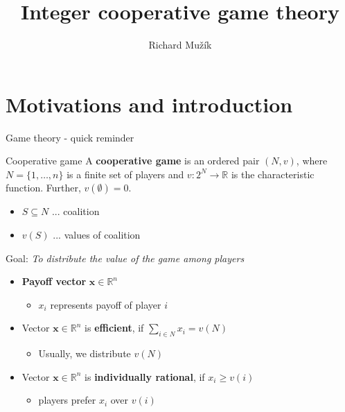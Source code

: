 \documentclass{beamer}
\title{Integer cooperative game theory}
\author{Richard Mužík}
\institute{richard@imuzik.cz}
\newcommand{\Rn}[1][n]{\mathbb{R}^{#1}}
\newcommand{\bx}{\textbf{x}}
\begin{document}

\begin{frame}
	\maketitle %
\end{frame}


\section{Motivations and introduction} %


\begin{frame}{Game theory - quick reminder}
    \begin{block}{Cooperative game}
        A \textbf{cooperative game} is an ordered pair $(N,v)$, where $N=\{1,\dots,n\}$ is a finite set of players and $v\colon 2^N \to \mathbb{R}$ is the characteristic function. Further, $v(\emptyset) = 0$.
    \end{block}
    \begin{itemize}
        \item $S \subseteq N$ ... coalition
        \item $v(S)$ ... values of coalition
    \end{itemize}
    Goal: \textit{To distribute the value of the game among players}
    \begin{itemize}
	    \item \textbf{Payoff vector} $\bx \in \Rn$
	    \begin{itemize}
	        \item $x_i$ represents payoff of player $i$
	    \end{itemize}
	    \item Vector $\bx \in \Rn$ is \textbf{efficient}, if $\sum_{i \in N}x_i = v(N)$
	    \begin{itemize}
	        \item Usually, we distribute $v(N)$
	    \end{itemize}
	    \item Vector $\bx \in \Rn$ is \textbf{individually rational}, if $x_i \geq v(i)$
	    \begin{itemize}
	        \item players prefer $x_i$ over $v(i)$
	    \end{itemize}
	\end{itemize}
\end{frame}
\end{document}
